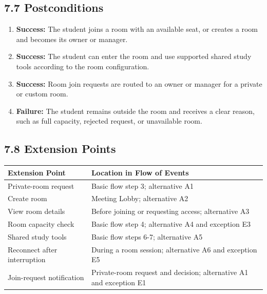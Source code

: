 \documentclass[12pt]{article}
\renewcommand{\baselinestretch}{1.5}
\begin{document}
\subsection*{7.7 Postconditions}
\par\medskip
\begin{enumerate}
\item \textbf{Success:} The student joins a room with an available seat, or creates a room and becomes its owner or manager.
\item \textbf{Success:} The student can enter the room and use supported shared study tools according to the room configuration.
\item \textbf{Success:} Room join requests are routed to an owner or manager for a private or custom room.
\item \textbf{Failure:} The student remains outside the room and receives a clear reason, such as full capacity, rejected request, or unavailable room.
\end{enumerate}
\par\medskip
\hypertarget{sec:7-8-extension-points}{}
\subsection*{7.8 Extension Points}
\par\medskip
\begingroup
\small
\renewcommand{\baselinestretch}{1.0}\selectfont
\renewcommand{\arraystretch}{1.15}
\setlength{\tabcolsep}{6pt}
\begin{longtable}{|>{\raggedright\arraybackslash}p{}|>{\raggedright\arraybackslash}p{}|}
\hline
\textbf{Extension Point} & \textbf{Location in Flow of Events} \\ \hline
\endhead
Private-room request & Basic flow step 3; alternative A1 \\ \hline
Create room & Meeting Lobby; alternative A2 \\ \hline
View room details & Before joining or requesting access; alternative A3 \\ \hline
Room capacity check & Basic flow step 4; alternative A4 and exception E3 \\ \hline
Shared study tools & Basic flow steps 6-7; alternative A5 \\ \hline
Reconnect after interruption & During a room session; alternative A6 and exception E5 \\ \hline
Join-request notification & Private-room request and decision; alternative A1 and exception E1 \\ \hline
\end{longtable}
\endgroup
\par\medskip
\end{document}

